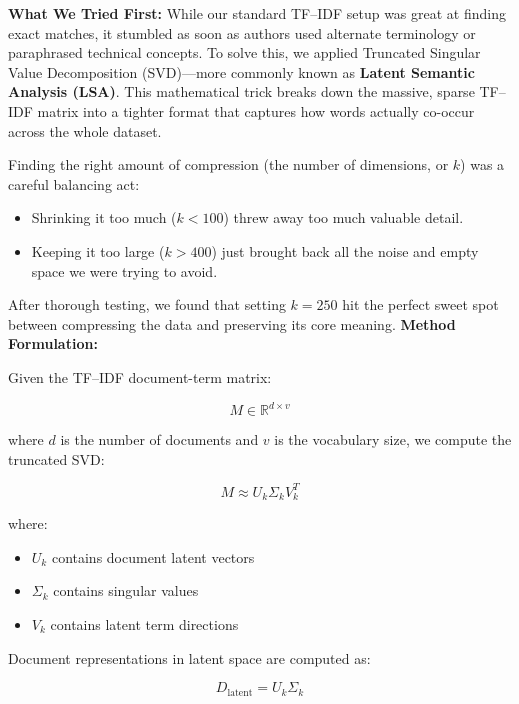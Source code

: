 \documentclass[runningheads]{llncs}
\begin{document}
\textbf{What We Tried First:}
While our standard TF--IDF setup was great at finding exact matches, it stumbled as soon as authors used alternate terminology or paraphrased technical concepts. To solve this, we applied Truncated Singular Value Decomposition (SVD)---more commonly known as \textbf{Latent Semantic Analysis (LSA)}. This mathematical trick breaks down the massive, sparse TF--IDF matrix into a tighter format that captures how words actually co-occur across the whole dataset.

Finding the right amount of compression (the number of dimensions, or $k$) was a careful balancing act:
\begin{itemize}
    \item Shrinking it too much ($k < 100$) threw away too much valuable detail.
    \item Keeping it too large ($k > 400$) just brought back all the noise and empty space we were trying to avoid.
\end{itemize}
After thorough testing, we found that setting $k = 250$ hit the perfect sweet spot between compressing the data and preserving its core meaning.
\textbf{Method Formulation:}

Given the TF--IDF document-term matrix:

\begin{equation}
M \in \mathbb{R}^{d \times v}
\end{equation}

where $d$ is the number of documents and $v$ is the vocabulary size,
we compute the truncated SVD:

\begin{equation}
M \approx U_k \Sigma_k V_k^T
\end{equation}

where:

\begin{itemize}[noitemsep]
    \item $U_k$ contains document latent vectors
    \item $\Sigma_k$ contains singular values
    \item $V_k$ contains latent term directions
\end{itemize}

Document representations in latent space are computed as:

\begin{equation}
D_{\text{latent}} = U_k \Sigma_k
\end{equation}
\end{document}

